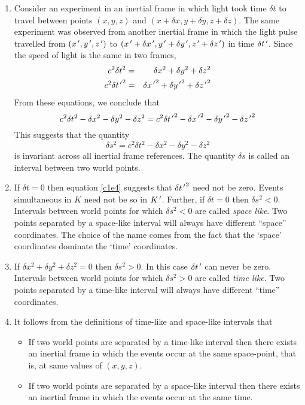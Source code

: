 \begin{enumerate}
\item Consider an experiment in an inertial frame in which light took time 
$\delta t$ to travel between points $(x, y, z)$ and $(x + \delta x, y + 
\delta y, z + \delta z)$. The same experiment was observed from another inertial 
frame in which the light pulse travelled from $(x^{\,\prime}, y^{\,\prime}, z^{\,\prime})$ to $(x^{\,\prime} 
+ \delta x^{\,\prime}, y^{\,\prime} + \delta y^{\,\prime}, z^{\,\prime} + \delta z^{\,\prime})$ in time $\delta 
t^{\,\prime}$.  Since the speed of light is the same in two frames,
\begin{eqnarray}
c^2\delta t^2 &=& \delta x^2 + \delta y^2 + \delta z^2 \label{c1e2} \\
c^2\delta {t^{\,\prime}}^2 &=& \delta {x^{\,\prime}}^2 + \delta {y^{\,\prime}}^2 + \delta {z^{\,\prime}}^2 
\label{c1e3}
\end{eqnarray}
From these equations, we conclude that
\begin{equation}\label{c1e4}
c^2\delta t^2 - \delta x^2 - \delta y^2 - \delta z^2 = 
c^2\delta {t^{\,\prime}}^2 - \delta {x^{\,\prime}}^2 - \delta {y^{\,\prime}}^2 - \delta {z^{\,\prime}}^2
\end{equation}
This suggests that the quantity 
\begin{equation}\label{c1e5}
\delta s^2 = c^2\delta t^2 - \delta x^2 - \delta y^2 - \delta z^2
\end{equation}
is invariant across all inertial frame references. The quantity $\delta s$ is
called an interval between two world points.

\item If $\delta t = 0$ then equation \eqref{c1e4} suggests that 
$\delta{t^{\,\prime}}^2$ need not be zero. Events simultaneous in $K$ need not be so 
in $K^{\,\prime}$. Further, if $\delta t = 0$ then $\delta s^2 < 0$. Intervals between 
world points for which $\delta s^2 < 0$ are called \emph{space like}. Two 
points separated by a space-like interval will always have different ``space'' 
coordinates. The choice of the name comes from the fact that the `space' 
coordinates dominate the `time' coordinates.

\item If $\delta x^2 + \delta y^2 + \delta z^2 = 0$ then $\delta s^2 > 0$. In 
this case $\delta t^{\,\prime}$ can never be zero. Intervals between world points for 
which $\delta s^2 > 0$ are called \emph{time like}. Two points separated by a 
time-like interval will always have different ``time'' coordinates.

\item It follows from the definitions of time-like and space-like intervals that
\begin{itemize}
\item If two world points are separated by a time-like interval then there 
exists an inertial frame in which the events occur at the same space-point, 
that is, at same values of $(x, y, z)$.
\item If two world points are separated by a space-like interval then there 
exists an inertial frame in which the events occur at the same time.
\end{itemize}


\end{enumerate}
